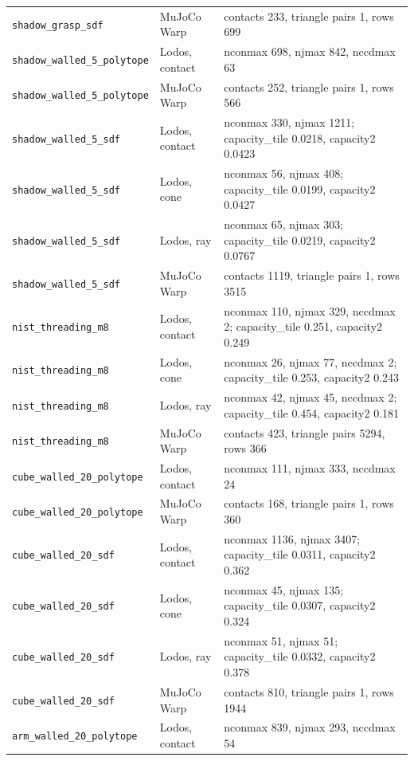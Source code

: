 \begin{longtable}{@{}llp{9.5cm}@{}}
\texttt{shadow\_grasp\_sdf} & MuJoCo Warp & contacts 233, triangle pairs 1, rows 699 \\
\texttt{shadow\_walled\_5\_polytope} & Lodos, contact & nconmax 698, njmax 842, nccdmax 63 \\
\texttt{shadow\_walled\_5\_polytope} & MuJoCo Warp & contacts 252, triangle pairs 1, rows 566 \\
\texttt{shadow\_walled\_5\_sdf} & Lodos, contact & nconmax 330, njmax 1211; capacity\_tile 0.0218, capacity2 0.0423 \\
\texttt{shadow\_walled\_5\_sdf} & Lodos, cone & nconmax 56, njmax 408; capacity\_tile 0.0199, capacity2 0.0427 \\
\texttt{shadow\_walled\_5\_sdf} & Lodos, ray & nconmax 65, njmax 303; capacity\_tile 0.0219, capacity2 0.0767 \\
\texttt{shadow\_walled\_5\_sdf} & MuJoCo Warp & contacts 1119, triangle pairs 1, rows 3515 \\
\texttt{nist\_threading\_m8} & Lodos, contact & nconmax 110, njmax 329, nccdmax 2; capacity\_tile 0.251, capacity2 0.249 \\
\texttt{nist\_threading\_m8} & Lodos, cone & nconmax 26, njmax 77, nccdmax 2; capacity\_tile 0.253, capacity2 0.243 \\
\texttt{nist\_threading\_m8} & Lodos, ray & nconmax 42, njmax 45, nccdmax 2; capacity\_tile 0.454, capacity2 0.181 \\
\texttt{nist\_threading\_m8} & MuJoCo Warp & contacts 423, triangle pairs 5294, rows 366 \\
\texttt{cube\_walled\_20\_polytope} & Lodos, contact & nconmax 111, njmax 333, nccdmax 24 \\
\texttt{cube\_walled\_20\_polytope} & MuJoCo Warp & contacts 168, triangle pairs 1, rows 360 \\
\texttt{cube\_walled\_20\_sdf} & Lodos, contact & nconmax 1136, njmax 3407; capacity\_tile 0.0311, capacity2 0.362 \\
\texttt{cube\_walled\_20\_sdf} & Lodos, cone & nconmax 45, njmax 135; capacity\_tile 0.0307, capacity2 0.324 \\
\texttt{cube\_walled\_20\_sdf} & Lodos, ray & nconmax 51, njmax 51; capacity\_tile 0.0332, capacity2 0.378 \\
\texttt{cube\_walled\_20\_sdf} & MuJoCo Warp & contacts 810, triangle pairs 1, rows 1944 \\
\texttt{arm\_walled\_20\_polytope} & Lodos, contact & nconmax 839, njmax 293, nccdmax 54 \\

\end{longtable}
